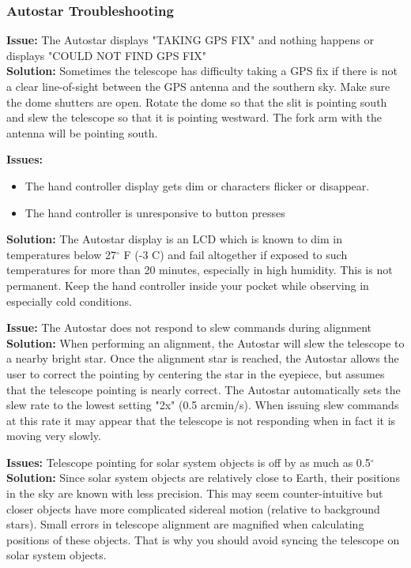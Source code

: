\documentclass[12pt,titlepage]{article}
\renewcommand\deg{\mbox{$^\circ$}}
\begin{document}
\subsubsection{Autostar Troubleshooting}\label{sssec:autostar_trouble}
\textbf{\flushleft Issue:} The Autostar displays "TAKING GPS FIX" and nothing happens or displays "COULD NOT FIND GPS FIX"\\
\textbf{Solution:} Sometimes the telescope has difficulty taking a GPS fix if there is not a clear line-of-sight between the GPS antenna and the southern sky. Make sure the dome shutters are open. Rotate the dome so that the slit is pointing south and slew the telescope so that it is pointing westward. The fork arm with the antenna will be pointing south. 

\textbf{\flushleft Issues:}
\begin{itemize}
	\item The hand controller display gets dim or characters flicker or disappear.
	\item The hand controller is unresponsive to button presses
\end{itemize}
\textbf{Solution:} The Autostar display is an LCD which is known to dim in temperatures below 27$\deg$ F (-3 C) and fail altogether if exposed to such temperatures for more than 20 minutes, especially in high humidity. This is not permanent. Keep the hand controller inside your pocket while observing in especially cold conditions.

\textbf{\flushleft Issue:} The Autostar does not respond to slew commands during alignment\\
\textbf{Solution:} When performing an alignment, the Autostar will slew the telescope to a nearby bright star. Once the alignment star is reached, the Autostar allows the user to correct the pointing by centering the star in the eyepiece, but assumes that the telescope pointing is nearly correct. The Autostar automatically sets the slew rate to the lowest setting "2x" (0.5 arcmin/s). When issuing slew commands at this rate it may appear that the telescope is not responding when in fact it is moving very slowly.


\textbf{\flushleft Issues:} Telescope pointing for solar system objects is off by as much as 0.5\deg\\
\textbf{Solution:}
Since solar system objects are relatively close to Earth, their positions in the sky are known with less precision. This may seem counter-intuitive but closer objects have more complicated sidereal motion (relative to background stars). Small errors in telescope alignment are magnified when calculating positions of these objects. That is why you should avoid syncing the telescope on solar system objects.
\end{document}
